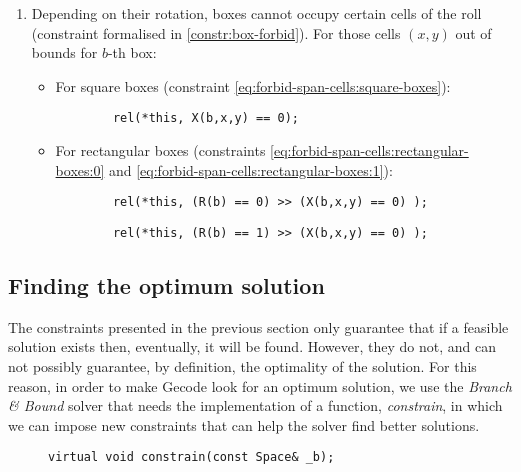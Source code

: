 \begin{enumerate}
	\item Depending on their rotation, boxes cannot occupy certain cells of the
	roll (constraint formalised in \ref{constr:box-forbid}). For those cells $(x,y)$
	out of bounds for $b$-th box:
    
	\begin{itemize}
		\item For square boxes (constraint \ref{eq:forbid-span-cells:square-boxes}):
		{\NOINDENT \begin{lstlisting}
		rel(*this, X(b,x,y) == 0);
		\end{lstlisting}}
		
		\item For rectangular boxes (constraints \ref{eq:forbid-span-cells:rectangular-boxes:0}
		and \ref{eq:forbid-span-cells:rectangular-boxes:1}):
		{\NOINDENT \begin{lstlisting}
		rel(*this, (R(b) == 0) >> (X(b,x,y) == 0) );
		\end{lstlisting}}
		{\NOINDENT \begin{lstlisting}
		rel(*this, (R(b) == 1) >> (X(b,x,y) == 0) );
		\end{lstlisting}}
	\end{itemize}
    
\end{enumerate}

\subsection{Finding the optimum solution}
\label{sec:constraint-programming:optimum}

The constraints presented in the previous section only guarantee that if a
feasible solution exists then, eventually, it will be found. However, they
do not, and can not possibly guarantee, by definition, the optimality of the
solution. For this reason, in order to make Gecode look for an optimum solution,
we use the \textit{Branch \& Bound} solver that needs the implementation of
a function, \textit{constrain}, in which we can impose new constraints that
can help the solver find better solutions.

\begin{figure}[H]
	\centering
	{\NOINDENT \begin{lstlisting}[xleftmargin=.24\textwidth]
	virtual void constrain(const Space& _b);
	\end{lstlisting}}
	\label{fig:constrain-header}
\end{figure}

